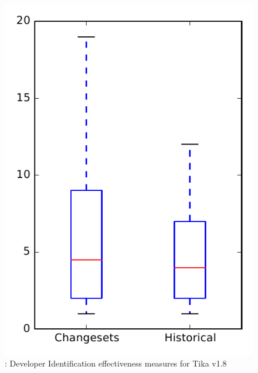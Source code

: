 
\begin{figure}
\centering
\includegraphics[height=0.4\textheight]{figures/dit/rq2_tika_no_outlier}
\caption{\dtwo: Developer Identification effectiveness measures for Tika v1.8}
\label{fig:dit:rq2:tika}
\end{figure}
